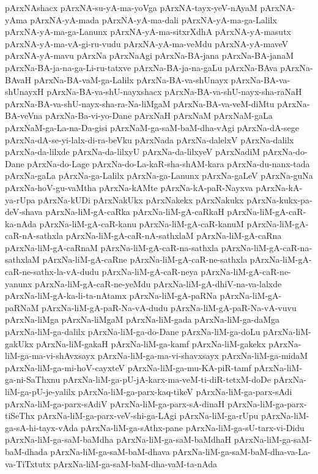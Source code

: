 {pArxNAshacx
pArxNA-su-yA-ma-yoVga
pArxNA-tayx-yeV-nAyaM
pArxNA-yAma
pArxNA-yA-mada
pArxNA-yA-ma-dali
pArxNA-yA-ma-ga-Lalilx
pArxNA-yA-ma-ga-Lanunx
pArxNA-yA-ma-sitxrXdhA
pArxNA-yA-masutx
pArxNA-yA-ma-vA-gi-ru-vudu
pArxNA-yA-ma-veMdu
pArxNA-yA-maveV
pArxNA-yA-mavu
pArxNa
pArxNaAgi
pArxNa-BA-jana
pArxNa-BA-janaM
pArxNa-BA-ja-na-ga-Li-ru-tatxve
pArxNa-BA-ja-na-gaLu
pArxNa-BAva
pArxNa-BAvaH
pArxNa-BA-vaM-ga-Lalilx
pArxNa-BA-va-shUnayx
pArxNa-BA-va-shUnayxH
pArxNa-BA-va-shU-nayxshacx
pArxNa-BA-va-shU-nayx-sha-raNaH
pArxNa-BA-va-shU-nayx-sha-ra-Na-liMgaM
pArxNa-BA-va-veM-diMtu
pArxNa-BA-veVna
pArxNa-Ba-vi-yo-Dane
pArxNaH
pArxNaM
pArxNaM-gaLa
pArxNaM-ga-La-na-Da-gisi
pArxNaM-ga-saM-baM-dha-vAgi
pArxNa-dA-sege
pArxNa-dA-se-yi-lalx-di-ra-beVku
pArxNada
pArxNa-dalelxV
pArxNa-dalilx
pArxNa-da-lilxde
pArxNa-da-lilxyU
pArxNa-da-lilxyeV
pArxNadiM
pArxNa-do-Dane
pArxNa-do-Lage
pArxNa-do-La-kaR-sha-shAM-kara
pArxNa-du-nanx-tada
pArxNa-gaLa
pArxNa-ga-Lalilx
pArxNa-ga-Lanunx
pArxNa-gaLeV
pArxNa-guNa
pArxNa-hoV-gu-vaMtha
pArxNa-kAMte
pArxNa-kA-paR-Nayxva
pArxNa-kA-ya-rUpa
pArxNa-kUDi
pArxNakUkx
pArxNakekx
pArxNakukx
pArxNa-kukx-pa-deV-shava
pArxNa-liM-gA-caRka
pArxNa-liM-gA-caRkaH
pArxNa-liM-gA-caR-ka-nAda
pArxNa-liM-gA-caR-kanu
pArxNa-liM-gA-caR-kanuM
pArxNa-liM-gA-caR-nA-sathxla
pArxNa-liM-gA-caR-nA-sathxlaM
pArxNa-liM-gA-caRna
pArxNa-liM-gA-caRnaM
pArxNa-liM-gA-caR-na-sathxla
pArxNa-liM-gA-caR-na-sathxlaM
pArxNa-liM-gA-caRne
pArxNa-liM-gA-caR-ne-sathxla
pArxNa-liM-gA-caR-ne-sathx-la-vA-dudu
pArxNa-liM-gA-caR-neya
pArxNa-liM-gA-caR-ne-yanunx
pArxNa-liM-gA-caR-ne-yeMdu
pArxNa-liM-gA-dhiV-na-va-lalxde
pArxNa-liM-gA-ka-li-ta-nAtamx
pArxNa-liM-gA-paRNa
pArxNa-liM-gA-paRNaM
pArxNa-liM-gA-paR-Na-vA-dudu
pArxNa-liM-gA-paR-Na-vA-vuvu
pArxNa-liMga
pArxNa-liMgaM
pArxNa-liM-gada
pArxNa-liM-ga-daMga
pArxNa-liM-ga-dalilx
pArxNa-liM-ga-do-Dane
pArxNa-liM-ga-doLu
pArxNa-liM-gakUkx
pArxNa-liM-gakaH
pArxNa-liM-ga-kamf
pArxNa-liM-gakekx
pArxNa-liM-ga-ma-vi-shAvxsayx
pArxNa-liM-ga-ma-vi-shavxsayx
pArxNa-liM-ga-midaM
pArxNa-liM-ga-mi-hoV-cayxteV
pArxNa-liM-ga-mu-KA-piR-tamf
pArxNa-liM-ga-ni-SaThxnu
pArxNa-liM-ga-pU-jA-karx-ma-veM-ti-diR-tetxM-doDe
pArxNa-liM-ga-pU-je-yalilx
pArxNa-liM-ga-parx-kaq-tikeV
pArxNa-liM-ga-parx-sAdi
pArxNa-liM-ga-parx-sAdiV
pArxNa-liM-ga-parx-sA-dinaH
pArxNa-liM-ga-parx-tiSeThx
pArxNa-liM-ga-parx-veV-shi-ga-LAgi
pArxNa-liM-ga-rUpu
pArxNa-liM-ga-sA-hi-tayx-vAda
pArxNa-liM-ga-sAthx-pane
pArxNa-liM-ga-sU-tarx-vi-Didu
pArxNa-liM-ga-saM-baMdha
pArxNa-liM-ga-saM-baMdhaH
pArxNa-liM-ga-saM-baM-dhada
pArxNa-liM-ga-saM-baM-dhava
pArxNa-liM-ga-saM-baM-dha-va-La-va-TiTxtutx
pArxNa-liM-ga-saM-baM-dha-vaM-ta-nAda
}
